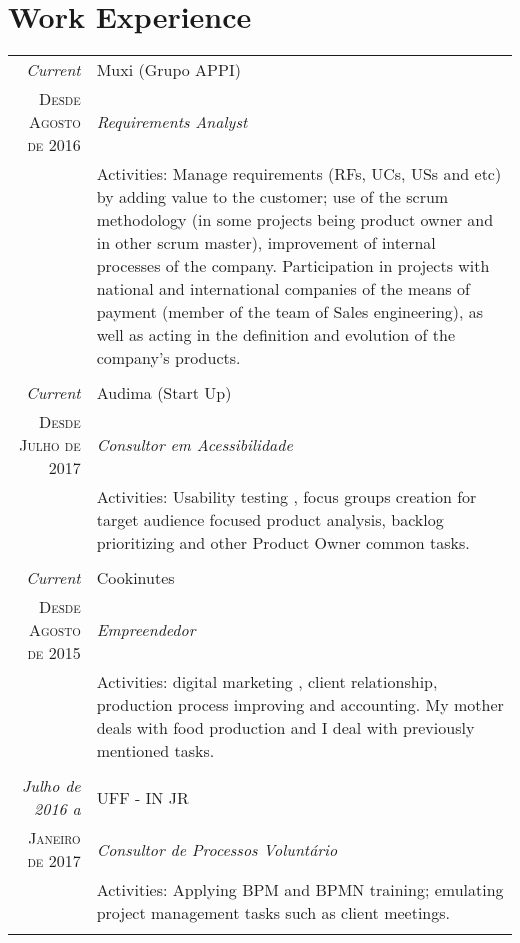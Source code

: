 \documentclass[a4paper,10pt]{article}
\begin{document}
\section{Work Experience}
\begin{tabular}{r|p{11cm}}
 \emph{Current} & Muxi (Grupo APPI) \\
 \textsc{Desde Agosto de 2016}&\emph{Requirements Analyst}\\
 &\footnotesize{Activities: Manage requirements (RFs, UCs, USs and etc) by adding value to the customer; use of the scrum methodology (in some projects being product owner and in other scrum master), improvement of internal processes of the company. Participation in projects with national and international companies of the means of payment (member of the team of Sales engineering), as well as acting in the definition and evolution of the company's products.}\\
  
 & \\
 
 \emph{Current} & Audima (Start Up) \\
 \textsc{Desde Julho de 2017}&\emph{Consultor em Acessibilidade}\\
 &\footnotesize{Activities: Usability testing , focus groups creation for target audience focused product analysis, backlog prioritizing and other Product Owner common tasks.}\\
 
 & \\
 
 \emph{Current} & Cookinutes \\
 \textsc{Desde Agosto de 2015}&\emph{Empreendedor}\\
 &\footnotesize{Activities: digital marketing , client relationship, production process improving and accounting. My mother deals with food production and I deal with previously mentioned tasks.}\\
 
 & \\
 
 \emph{Julho de 2016 a} & UFF - IN JR \\
 \textsc{Janeiro de 2017}&\emph{Consultor de Processos Voluntário}\\
 &\footnotesize{Activities: Applying BPM and BPMN training; emulating project management tasks such as client meetings.}\\
 
 & \\
 

\end{tabular}
\end{document}
